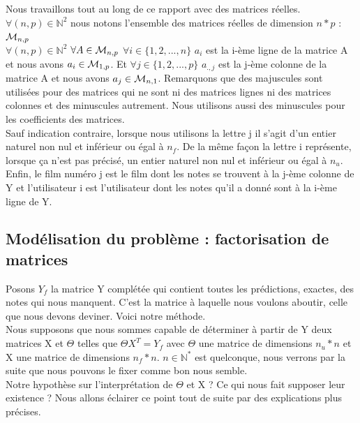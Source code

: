 \documentclass[a4paper,10pt]{article}
\begin{document}
Nous travaillons tout au long de ce rapport avec des matrices réelles. $\forall (n, p) \in \mathbb{N}^2$ nous notons l'ensemble des matrices réelles de dimension $n * p$ : ${\cal M}_{n, p}$\\
$\forall (n, p) \in \mathbb{N}^2$ $\forall A \in {\cal M}_{n, p}$ $\forall i \in \{1, 2, ..., n\}$ $a_i$ est la i-ème ligne de la matrice A et nous avons $a_i \in {\cal M}_{1, p}$. Et $\forall j \in \{1, 2, ..., p\}$ $a_{., j}$ est la j-ème colonne de la matrice A et nous avons $a_j \in {\cal M}_{n, 1}$. Remarquons que des majuscules sont utilisées pour des matrices qui ne sont ni des matrices lignes ni des matrices colonnes et des minuscules autrement. Nous utilisons aussi des minuscules pour les coefficients des matrices.\\
Sauf indication contraire, lorsque nous utilisons la lettre j il s'agit d'un entier naturel non nul et inférieur ou égal à $n_f$. De la même façon la lettre i représente, lorsque ça n'est pas précisé, un entier naturel non nul et inférieur ou égal à $n_u$.\\
Enfin, le film numéro j est le film dont les notes se trouvent à la j-ème colonne de Y et l'utilisateur i est l'utilisateur dont les notes qu'il a donné sont à la i-ème ligne de Y.

\subsection{Modélisation du problème : factorisation de matrices}

Posons $Y_f$ la matrice Y complétée qui contient toutes les prédictions, exactes, des notes qui nous manquent. C'est la matrice à laquelle nous voulons aboutir, celle que nous devons deviner. Voici notre méthode.\\ 
 
Nous supposons que nous sommes capable de déterminer à partir de Y deux matrices X et $\Theta$ telles que $\Theta X^T = Y_f$ avec $\Theta$ une matrice de dimensions $n_u * n$ et X une matrice de dimensions $n_f * n$. $n \in \mathbb{N}^*$ est quelconque, nous verrons par la suite que nous pouvons le fixer comme bon nous semble.\\ 
Notre hypothèse sur l'interprétation de $\Theta$ et X ? Ce qui nous fait supposer leur existence ? Nous allons éclairer ce point tout de suite par des explications plus précises.\\
\end{document}
